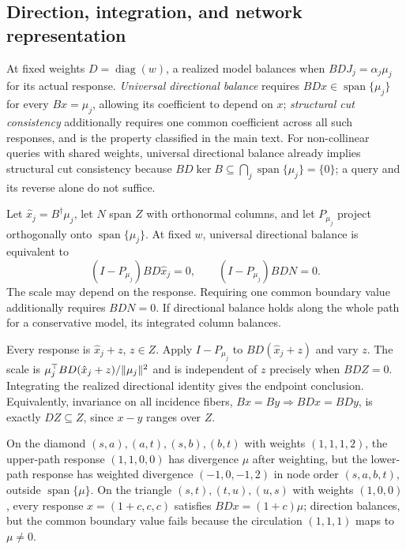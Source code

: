 \subsection{Direction, integration, and network representation}\label{supp:criteria}
At fixed weights $D=\operatorname{diag}(w)$, a realized model balances
when $BDJ_j=\alpha_j\mu_j$ for its actual response.
\emph{Universal directional balance} requires
$BDx\in\operatorname{span}\{\mu_j\}$ for every $Bx=\mu_j$, allowing its
coefficient to depend on $x$; \emph{structural cut consistency}
additionally requires one common coefficient across all such responses,
and is the property classified in the main text. For non-collinear
queries with shared weights, universal directional balance already
implies structural cut consistency because
$BD\ker B\subseteq\bigcap_j\operatorname{span}\{\mu_j\}=\{0\}$;
a query and its reverse alone do not suffice.
\begin{proposition}\label{prop:directional}
Let $\hat x_j=B^\dagger\mu_j$, let $N$ span $Z$ with orthonormal
columns, and let $P_{\mu_j}$ project orthogonally onto
$\operatorname{span}\{\mu_j\}$. At fixed $w$, universal directional
balance is equivalent to
\[
(I-P_{\mu_j})BD\hat x_j=0,\qquad (I-P_{\mu_j})BDN=0.
\]
The scale may depend on the response. Requiring one common boundary value
additionally requires $BDN=0$. If directional balance holds along the
whole path for a conservative model, its integrated column balances.
\end{proposition}
\begin{pf}
Every response is $\hat x_j+z$, $z\in Z$. Apply $I-P_{\mu_j}$ to
$BD(\hat x_j+z)$ and vary $z$. The scale is
$\mu_j^\top BD(\hat x_j+z)/\lVert \mu_j \rVert^2$ and is independent of
$z$ precisely when $BDZ=0$. Integrating the realized directional
identity gives the endpoint conclusion. Equivalently, invariance on
all incidence fibers, $Bx=By\Rightarrow BDx=BDy$, is exactly
$DZ\subseteq Z$, since $x-y$ ranges over $Z$.
\end{pf}

\begin{example}\label{ex:triangle}
On the diamond $(s,a),(a,t),(s,b),(b,t)$ with weights $(1,1,1,2)$,
the upper-path response $(1,1,0,0)$ has divergence $\mu$ after
weighting, but the lower-path response has weighted divergence
$(-1,0,-1,2)$ in node order $(s,a,b,t)$, outside $\operatorname{span}\{\mu\}$.
On the triangle $(s,t),(t,u),(u,s)$ with weights $(1,0,0)$, every
response $x=(1+c,c,c)$ satisfies $BDx=(1+c)\mu$; direction balances,
but the common boundary value fails because the circulation $(1,1,1)$ maps
to $\mu\ne0$.
\end{example}

